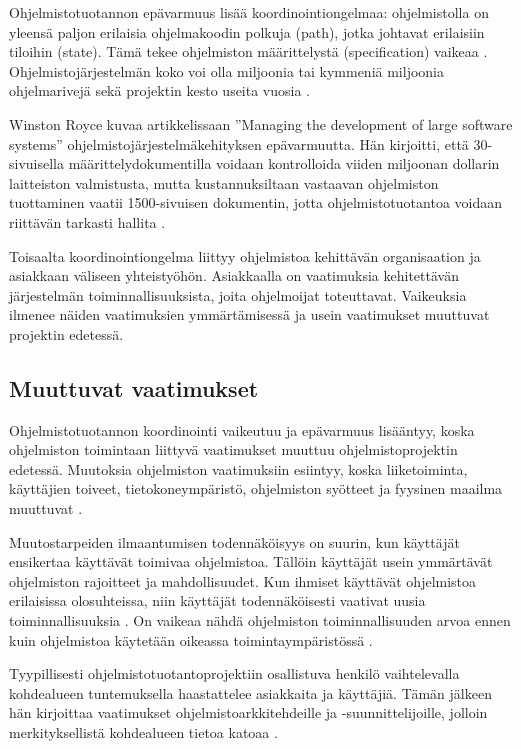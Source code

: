 \documentclass[finnish]{tktltiki2}
\theoremstyle{definition}
\theoremstyle{remark}
\begin{document}
Ohjelmistotuotannon epävarmuus lisää koordinointiongelmaa: ohjelmistolla on yleensä paljon erilaisia ohjelmakoodin polkuja (path), jotka johtavat erilaisiin tiloihin (state). Tämä tekee ohjelmiston määrittelystä (specification) vaikeaa \cite{BOE06}. Ohjelmistojärjestelmän koko voi olla miljoonia tai kymmeniä miljoonia ohjelmarivejä sekä projektin kesto useita vuosia \cite{KES95}. 

Winston Royce kuvaa artikkelissaan ''Managing the development of large software systems'' ohjelmistojärjestelmäkehityksen epävarmuutta. Hän kirjoitti, että 30-sivuisella määrittelydokumentilla voidaan kontrolloida viiden miljoonan dollarin laitteiston valmistusta, mutta kustannuksiltaan vastaavan ohjelmiston tuottaminen vaatii 1500-sivuisen dokumentin, jotta ohjelmistotuotantoa voidaan riittävän tarkasti hallita \cite{ROY70}.

Toisaalta koordinointiongelma liittyy ohjelmistoa kehittävän organisaation ja asiakkaan väliseen yhteistyöhön. Asiakkaalla on vaatimuksia kehitettävän järjestelmän toiminnallisuuksista, joita ohjelmoijat toteuttavat. Vaikeuksia ilmenee näiden vaatimuksien ymmärtämisessä ja usein vaatimukset muuttuvat projektin edetessä. 

\subsection{Muuttuvat vaatimukset}

Ohjelmistotuotannon koordinointi vaikeutuu ja epävarmuus lisääntyy, koska ohjelmiston toimintaan liittyvä vaatimukset muuttuu ohjelmistoprojektin edetessä. Muutoksia ohjelmiston vaatimuksiin esiintyy, koska liiketoiminta, käyttäjien toiveet, tietokoneympäristö, ohjelmiston syötteet ja fyysinen maailma muuttuvat \cite{KES95}.

Muutostarpeiden ilmaantumisen todennäköisyys on suurin, kun käyttäjät ensikertaa käyttävät toimivaa ohjelmistoa. Tällöin käyttäjät usein ymmärtävät ohjelmiston rajoitteet ja mahdollisuudet. Kun ihmiset käyttävät ohjelmistoa erilaisissa olosuhteissa, niin käyttäjät todennäköisesti vaativat uusia toiminnallisuuksia \cite{KES95}. On vaikeaa nähdä ohjelmiston toiminnallisuuden arvoa ennen kuin ohjelmistoa käytetään oikeassa toimintaympäristössä \cite{FOW01a}.

Tyypillisesti ohjelmistotuotantoprojektiin osallistuva henkilö vaihtelevalla kohdealueen tuntemuksella haastattelee asiakkaita ja käyttäjiä. Tämän jälkeen hän kirjoittaa vaatimukset ohjelmistoarkkitehdeille ja -suunnittelijoille, jolloin merkityksellistä kohdealueen tietoa katoaa \cite{KES95}.
\end{document}

